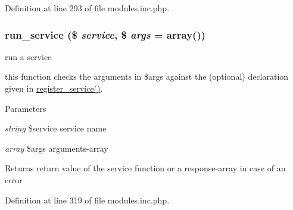 Definition at line 293 of file modules.inc.php.

\hypertarget{modules_8inc_8php_a3d581f1636df2e24ffe7b013a12fb1db}{
\subsubsection[{run\_\-service}]{\setlength{\rightskip}{0pt plus 5cm}run\_\-service (\$ {\em service}, \/  \$ {\em args} = {\ttfamily array()})}}
\label{modules_8inc_8php_a3d581f1636df2e24ffe7b013a12fb1db}
run a service

this function checks the arguments in \$args against the (optional) declaration given in \hyperlink{modules_8inc_8php_ae6ed600fb2ce39a4b0837bbb01fe8d6e}{register\_\-service()}. 
\begin{DoxyParams}{Parameters}
\item[{\em string}]\$service service name \item[{\em array}]\$args arguments-\/array \end{DoxyParams}
\begin{DoxyReturn}{Returns}
return value of the service function or a response-\/array in case of an error 
\end{DoxyReturn}


Definition at line 319 of file modules.inc.php.

